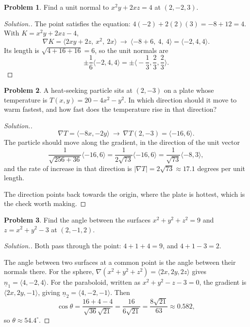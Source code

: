 \documentclass[11pt,a4paper]{article}
\theoremstyle{definition}
\newtheorem{problemx}{Problem}[subsection]
\newenvironment{problem}{\begin{problemx}}{\end{problemx}}
\newenvironment{solution}
  {\renewcommand{\qedsymbol}{}\begin{proof}[\textit{Solution}.]}
  {\end{proof}}
\begin{document}
\begin{problem}
Find a unit normal to $x^2y+2xz = 4$ at $(2,-2,3)$.
\end{problem}
\begin{solution}
The point satisfies the equation: $4(-2)+2(2)(3) = -8+12 = 4$. With
$K = x^2y+2xz-4$,
$$\nabla K = \langle 2xy+2z,\ x^2,\ 2x\rangle
\ \longrightarrow\ \langle -8+6,\ 4,\ 4\rangle = \langle -2, 4, 4\rangle .$$
Its length is $\sqrt{4+16+16} = 6$, so the unit normals are
$$\pm\frac{1}{6}\langle -2,4,4\rangle
= \pm\Big\langle -\frac13, \frac23, \frac23\Big\rangle .$$
\end{solution}

\begin{problem}
A heat-seeking particle sits at $(2,-3)$ on a plate whose temperature is
$T(x,y) = 20-4x^2-y^2$. In which direction should it move to warm fastest, and
how fast does the temperature rise in that direction?
\end{problem}
\begin{solution}
$$\nabla T = \langle -8x, -2y\rangle
\ \longrightarrow\ \nabla T(2,-3) = \langle -16, 6\rangle .$$
The particle should move along the gradient, in the direction of the unit vector
$$\frac{1}{\sqrt{256+36}}\langle -16, 6\rangle
= \frac{1}{2\sqrt{73}}\langle -16, 6\rangle
= \frac{1}{\sqrt{73}}\langle -8, 3\rangle ,$$
and the rate of increase in that direction is
$\left|\nabla T\right| = 2\sqrt{73}\approx 17.1$ degrees per unit length.

The direction points back towards the origin, where the plate is hottest, which
is the check worth making.
\end{solution}

\begin{problem}
Find the angle between the surfaces $x^2+y^2+z^2 = 9$ and $z = x^2+y^2-3$ at
$(2,-1,2)$.
\end{problem}
\begin{solution}
Both pass through the point: $4+1+4 = 9$, and $4+1-3 = 2$.

The angle between two surfaces at a common point is the angle between their
normals there. For the sphere, $\nabla(x^2+y^2+z^2) = \langle 2x,2y,2z\rangle$
gives $\underline{n}_1 = \langle 4,-2,4\rangle$. For the paraboloid, written as
$x^2+y^2-z-3 = 0$, the gradient is $\langle 2x,2y,-1\rangle$, giving
$\underline{n}_2 = \langle 4,-2,-1\rangle$. Then
$$\cos\theta
= \frac{16+4-4}{\sqrt{36}\sqrt{21}} = \frac{16}{6\sqrt{21}}
= \frac{8\sqrt{21}}{63}\approx 0.582 ,$$
so $\theta\approx 54.4^{\circ}$.
\end{solution}
\end{document}
